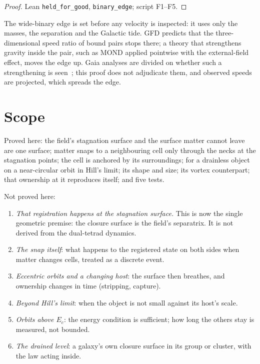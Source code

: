 \documentclass[twocolumn]{iopjournal}
\begin{document}
\begin{proof}
Lean \texttt{held\_for\_good}, \texttt{binary\_edge}; script F1--F5.
\end{proof}

The wide-binary edge is set before any velocity is inspected: it uses
only the masses, the separation and the Galactic tide. GFD predicts that
the three-dimensional speed ratio of bound pairs stops there; a theory
that strengthens gravity inside the pair, such as MOND applied pointwise
with the external-field effect, moves the edge up. Gaia analyses are
divided on whether such a strengthening is seen~\cite{Chae2023,
Banik2024}; this proof does not adjudicate them, and observed speeds are
projected, which spreads the edge.


\section*{Scope}

Proved here: the field's stagnation surface and the surface matter
cannot leave are one surface; matter snaps to a neighbouring cell only
through the necks at the stagnation points; the cell is anchored by its
surroundings; for a drainless object on a near-circular orbit
in Hill's limit; its shape and size; its vortex counterpart; that
ownership at it reproduces itself; and five tests.

Not proved here:
\begin{enumerate}
\item \emph{That registration happens at the stagnation surface.} This
is now the single geometric premise: the closure surface is the field's
separatrix. It is not derived from the dual-tetrad dynamics.
\item \emph{The snap itself}: what happens to the registered state on
both sides when matter changes cells, treated as a discrete event.
\item \emph{Eccentric orbits and a changing host}: the surface then
breathes, and ownership changes in time (stripping, capture).
\item \emph{Beyond Hill's limit}: when the object is not small against
its host's scale.
\item \emph{Orbits above $E_c$}: the energy condition is sufficient; how
long the others stay is measured, not bounded.
\item \emph{The drained level}: a galaxy's own closure surface in its
group or cluster, with the law acting inside.
\end{enumerate}
\end{document}
